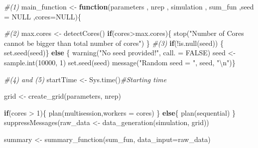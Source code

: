 \documentclass[11pt,a4paper]{article}
\newenvironment{Shaded}{\begin{snugshade}}{\end{snugshade}}
\newcommand{\AttributeTok}[1]{\textcolor[rgb]{0.77,0.63,0.00}{#1}}
\newcommand{\CommentTok}[1]{\textcolor[rgb]{0.56,0.35,0.01}{\textit{#1}}}
\newcommand{\ConstantTok}[1]{\textcolor[rgb]{0.00,0.00,0.00}{#1}}
\newcommand{\ControlFlowTok}[1]{\textcolor[rgb]{0.13,0.29,0.53}{\textbf{#1}}}
\newcommand{\DecValTok}[1]{\textcolor[rgb]{0.00,0.00,0.81}{#1}}
\newcommand{\FunctionTok}[1]{\textcolor[rgb]{0.00,0.00,0.00}{#1}}
\newcommand{\NormalTok}[1]{#1}
\newcommand{\OtherTok}[1]{\textcolor[rgb]{0.56,0.35,0.01}{#1}}
\newcommand{\SpecialCharTok}[1]{\textcolor[rgb]{0.00,0.00,0.00}{#1}}
\newcommand{\StringTok}[1]{\textcolor[rgb]{0.31,0.60,0.02}{#1}}
\begin{document}
\begin{Shaded}
\begin{Highlighting}[]
\CommentTok{\#(1)}
\NormalTok{main\_function }\OtherTok{\textless{}{-}}  \ControlFlowTok{function}\NormalTok{(parameters }
\NormalTok{                           , nrep }
\NormalTok{                           , simulation }
\NormalTok{                           , sum\_fun }
\NormalTok{                           ,}\AttributeTok{seed =} \ConstantTok{NULL}
\NormalTok{                           ,}\AttributeTok{cores=}\ConstantTok{NULL}\NormalTok{)\{}
 
    
  \CommentTok{\#(2)}
\NormalTok{  max.cores }\OtherTok{\textless{}{-}} \FunctionTok{detectCores}\NormalTok{()}
  \ControlFlowTok{if}\NormalTok{(cores}\SpecialCharTok{\textgreater{}}\NormalTok{max.cores)\{}
    \FunctionTok{stop}\NormalTok{(}\StringTok{"Number of Cores cannot be bigger than total number of cores"}\NormalTok{)}
\NormalTok{  \}}
  \CommentTok{\#(3)}
  \ControlFlowTok{if}\NormalTok{(}\SpecialCharTok{!}\FunctionTok{is.null}\NormalTok{(seed)) \{}
    \FunctionTok{set.seed}\NormalTok{(seed)\}}
  \ControlFlowTok{else}\NormalTok{ \{}
    \FunctionTok{warning}\NormalTok{(}\StringTok{"No seed provided!"}\NormalTok{, }\AttributeTok{call. =} \ConstantTok{FALSE}\NormalTok{)}
\NormalTok{    seed }\OtherTok{\textless{}{-}} \FunctionTok{sample.int}\NormalTok{(}\DecValTok{10000}\NormalTok{, }\DecValTok{1}\NormalTok{)}
    \FunctionTok{set.seed}\NormalTok{(seed)}
    \FunctionTok{message}\NormalTok{(}\StringTok{"Random seed = "}\NormalTok{, seed, }\StringTok{"}\SpecialCharTok{\textbackslash{}n}\StringTok{"}\NormalTok{)\} }
  
  \CommentTok{\#(4) and (5)}
\NormalTok{  startTime }\OtherTok{\textless{}{-}} \FunctionTok{Sys.time}\NormalTok{()}\CommentTok{\#Starting time }
  
  
  
\NormalTok{  grid }\OtherTok{\textless{}{-}} \FunctionTok{create\_grid}\NormalTok{(parameters, nrep) }
  
  \ControlFlowTok{if}\NormalTok{(cores }\SpecialCharTok{\textgreater{}} \DecValTok{1}\NormalTok{)\{}
    \FunctionTok{plan}\NormalTok{(multisession,}\AttributeTok{workers =}\NormalTok{ cores)}
\NormalTok{  \} }\ControlFlowTok{else}\NormalTok{\{}
    \FunctionTok{plan}\NormalTok{(sequential)}
\NormalTok{  \}}
  \FunctionTok{suppressMessages}\NormalTok{(raw\_data }\OtherTok{\textless{}{-}} \FunctionTok{data\_generation}\NormalTok{(simulation, grid))}
  
\NormalTok{  summary }\OtherTok{\textless{}{-}} \FunctionTok{summary\_function}\NormalTok{(sum\_fun, }\AttributeTok{data\_input=}\NormalTok{raw\_data) }
  

\end{Highlighting}
\end{Shaded}
\end{document}
